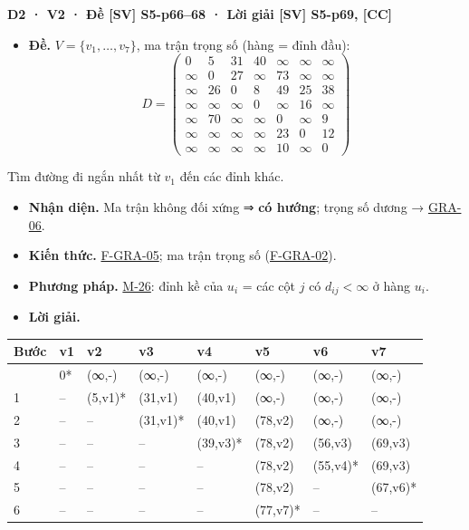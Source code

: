\documentclass[
  10pt,
  twoside,openany]{book}
\providecommand{\tightlist}{%
  \setlength{\itemsep}{0pt}\setlength{\parskip}{0pt}}
\begin{document}
\textbf{D2 · V2 · Đề {[}SV{]} S5-p66--68 · Lời giải {[}SV{]} S5-p69,
{[}CC{]}}

\begin{itemize}
\tightlist
\item
  \textbf{Đề.} \(V=\{v_1,\dots,v_7\}\), ma trận trọng số (hàng = đỉnh
  đầu): \[
  D=\begin{pmatrix}0&5&31&40&\infty&\infty&\infty\\ \infty&0&27&\infty&73&\infty&\infty\\ \infty&26&0&8&49&25&38\\ \infty&\infty&\infty&0&\infty&16&\infty\\ \infty&70&\infty&\infty&0&\infty&9\\ \infty&\infty&\infty&\infty&23&0&12\\ \infty&\infty&\infty&\infty&10&\infty&0\end{pmatrix}
  \]
\end{itemize}

Tìm đường đi ngắn nhất từ \(v_1\) đến các đỉnh khác.

\begin{itemize}
\tightlist
\item
  \textbf{Nhận diện.} Ma trận không đối xứng ⇒ \textbf{có hướng}; trọng
  số dương → \protect\hyperlink{GRA-06}{GRA-06}.
\item
  \textbf{Kiến thức.} \protect\hyperlink{F-GRA-05}{F-GRA-05}; ma trận
  trọng số (\protect\hyperlink{F-GRA-02}{F-GRA-02}).
\item
  \textbf{Phương pháp.} \protect\hyperlink{M-26}{M-26}: đỉnh kề của
  \(u_i\) = các cột \(j\) có \(d_{ij}<\infty\) ở hàng \(u_i\).
\item
  \textbf{Lời giải.}
\end{itemize}

\begin{longtable}[]{@{}llllllll@{}}
\toprule\noalign{}
Bước & v1 & v2 & v3 & v4 & v5 & v6 & v7 \\
\midrule\noalign{}
\endhead
\bottomrule\noalign{}
\endlastfoot
0 & 0* & (∞,-) & (∞,-) & (∞,-) & (∞,-) & (∞,-) & (∞,-) \\
1 & -- & (5,v1)* & (31,v1) & (40,v1) & (∞,-) & (∞,-) & (∞,-) \\
2 & -- & -- & (31,v1)* & (40,v1) & (78,v2) & (∞,-) & (∞,-) \\
3 & -- & -- & -- & (39,v3)* & (78,v2) & (56,v3) & (69,v3) \\
4 & -- & -- & -- & -- & (78,v2) & (55,v4)* & (69,v3) \\
5 & -- & -- & -- & -- & (78,v2) & -- & (67,v6)* \\
6 & -- & -- & -- & -- & (77,v7)* & -- & -- \\
\end{longtable}
\end{document}
